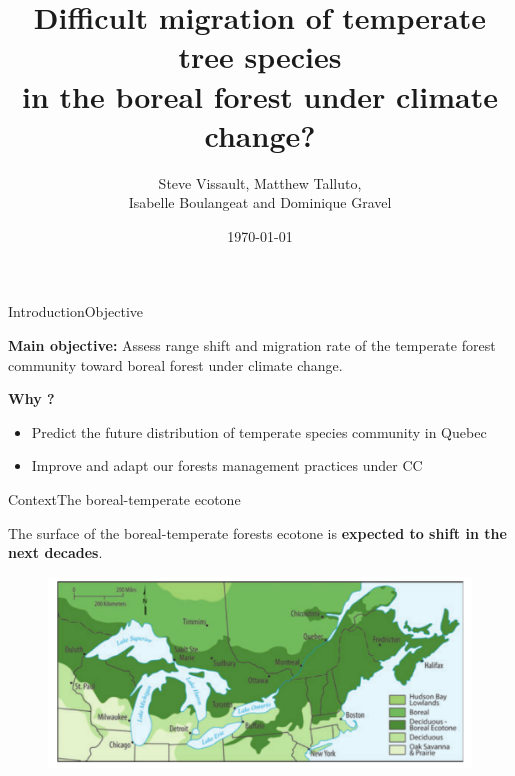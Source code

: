 \documentclass[10pt,aspectratio=149]{beamer}
\author{Steve Vissault, Matthew Talluto, \\
Isabelle Boulangeat and Dominique Gravel}
\title{Difficult migration of temperate tree species \\
in the boreal forest under climate change?}
\date{\today}
\institute{Université du Québec à Rimouski}
\begin{document}
\begin{frame}[plain]
   \titlepage
\end{frame}






\begin{frame}{Introduction}{Objective}

\textbf{Main objective:} Assess range shift and migration rate of the temperate forest community toward boreal forest under climate change.

\pause 

\vspace{1em}
\textbf{Why ?}
		\begin{itemize}
			\item Predict the future distribution of temperate species community in Quebec
		 	\item Improve and adapt our forests management practices under CC
		\end{itemize}

\end{frame}


\begin{frame}{Context}{The boreal-temperate ecotone}

The surface of the boreal-temperate forests ecotone is \textbf{expected to shift in the next decades}.

\begin{figure}
	\includegraphics[width=.70\paperwidth]{Figs/ecotone.pdf}
\end{figure}

\end{frame}
\end{document}
